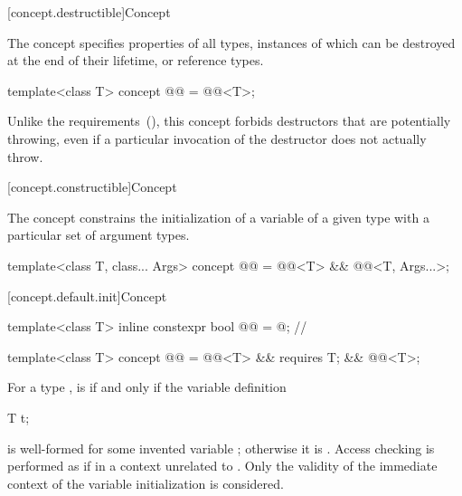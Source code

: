 [concept.destructible]{Concept }

\pnum
The  concept specifies properties of all types,
instances of which can be destroyed at the end of their lifetime, or reference
types.

\begin{itemdecl}
template<class T>
  concept @@ = @@<T>;
\end{itemdecl}

\begin{itemdescr}
\pnum
\begin{note}
Unlike the  requirements~(), this
concept forbids destructors that are potentially throwing, even if a particular
invocation of the destructor does not actually throw.
\end{note}
\end{itemdescr}

[concept.constructible]{Concept }

\pnum
The  concept constrains the initialization of a
variable of a given type with a particular set of argument types.

\begin{itemdecl}
template<class T, class... Args>
  concept @@ = @@<T> && @@<T, Args...>;
\end{itemdecl}

[concept.default.init]{Concept }

\begin{itemdecl}
template<class T>
  inline constexpr bool @@ = @\seebelow@;  // \expos

template<class T>
  concept @@ = @@<T> &&
                                  requires { T{}; } &&
                                  @@<T>;
\end{itemdecl}

\begin{itemdescr}
\pnum
For a type ,  is 
if and only if the variable definition
\begin{codeblock}
T t;
\end{codeblock}
is well-formed for some invented variable ;
otherwise it is .
Access checking is performed as if in a context unrelated to .
Only the validity of the immediate context of the variable initialization is considered.
\end{itemdescr}

